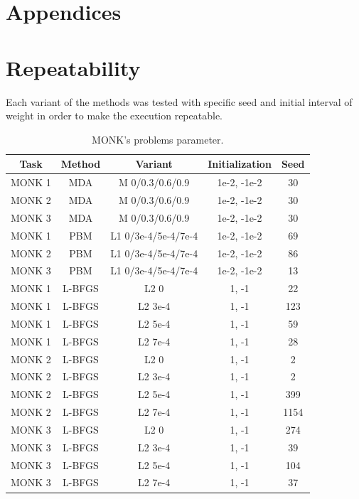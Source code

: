 \appendix
{}
\section*{Appendices}
\section{Repeatability}
Each variant of the methods was tested with specific seed and initial interval of weight in order to make the execution repeatable.

\begin{table}[H]
	\centering
	\begin{tabular}{|c|c|c|c|c|}
		\hline
		\textbf{Task} &	\textbf{Method} &\textbf{ Variant} & \textbf{Initialization} &\textbf{Seed} \\ \hline
		MONK 1        &    MDA & M  0/0.3/0.6/0.9 & 1e-2, -1e-2 & 30  \\ \hline
		MONK 2        &    MDA & M  0/0.3/0.6/0.9 & 1e-2, -1e-2 & 30  \\ \hline
		MONK 3        &    MDA & M  0/0.3/0.6/0.9 & 1e-2, -1e-2 & 30  \\ \hline			
		MONK 1        &    PBM & L1  0/3e-4/5e-4/7e-4 & 1e-2, -1e-2 & 69  \\ \hline
		MONK 2        &    PBM & L1  0/3e-4/5e-4/7e-4 & 1e-2, -1e-2 & 86  \\ \hline
		MONK 3        &    PBM & L1  0/3e-4/5e-4/7e-4 & 1e-2, -1e-2 & 13  \\ \hline			
		MONK 1        &    L-BFGS & L2  0 & 1, -1 & 22  \\ \hline
		MONK 1        &    L-BFGS & L2  3e-4 & 1, -1 & 123  \\ \hline
		MONK 1        &    L-BFGS & L2  5e-4 & 1, -1 & 59  \\ \hline
		MONK 1        &    L-BFGS & L2  7e-4 & 1, -1 & 28  \\ \hline
		MONK 2        &    L-BFGS & L2  0 & 1, -1 & 2  \\ \hline
		MONK 2        &    L-BFGS & L2  3e-4 & 1, -1 & 2  \\ \hline
		MONK 2        &    L-BFGS & L2  5e-4 & 1, -1 & 399  \\ \hline
		MONK 2        &    L-BFGS & L2  7e-4 & 1, -1 & 1154  \\ \hline
		MONK 3        &    L-BFGS & L2  0 & 1, -1 & 274  \\ \hline
		MONK 3        &    L-BFGS & L2  3e-4 & 1, -1 & 39  \\ \hline
		MONK 3        &    L-BFGS & L2  5e-4 & 1, -1 & 104  \\ \hline
		MONK 3        &    L-BFGS & L2  7e-4 & 1, -1 & 37  \\ \hline
	\end{tabular}
	\caption{MONK's problems parameter.}
	\label{tab:dati}
\end{table}
